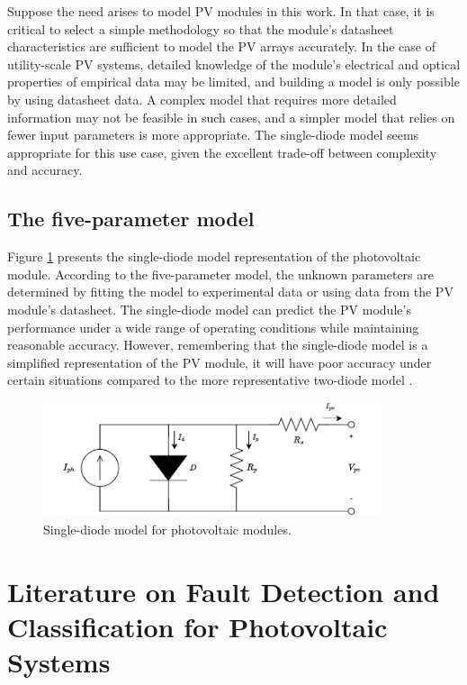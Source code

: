 Suppose the need arises to model PV modules in this work. In that case, it is critical to select a simple methodology so that the module's datasheet characteristics are sufficient to model the PV arrays accurately. In the case of utility-scale PV systems, detailed knowledge of the module's electrical and optical properties of empirical data may be limited, and building a model is only possible by using datasheet data. A complex model that requires more detailed information may not be feasible in such cases, and a simpler model that relies on fewer input parameters is more appropriate. The single-diode model seems appropriate for this use case, given the excellent trade-off between complexity and accuracy.

\subsection{The five-parameter model}

Figure \ref{fig:onediodedraw} presents the single-diode model representation of the photovoltaic module. According to the five-parameter model, the unknown parameters are determined by fitting the model to experimental data or using data from the PV module's datasheet. The single-diode model can predict the PV module's performance under a wide range of operating conditions while maintaining reasonable accuracy. However, remembering that the single-diode model is a simplified representation of the PV module, it will have poor accuracy under certain situations compared to the more representative two-diode model \cite{Godina2017}.

\begin{figure}[H]
    \centering
    \includegraphics[width=10cm]{figures/chapter2/onediode.drawio.pdf} \caption{Single-diode model for photovoltaic modules.}
    \label{fig:onediodedraw}
\end{figure}

\section{Literature on Fault Detection and Classification for Photovoltaic Systems}

